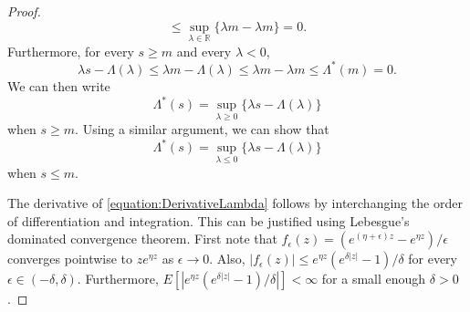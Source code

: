 \begin{proof}
\begin{equation*}
\leq \sup_{\lambda \in \mathbb{R}} \{ \lambda m - \lambda m \} = 0 .
\end{equation*}
Furthermore, for every $s \geq m$ and every $\lambda < 0$,
\begin{equation*}
\lambda s - \Lambda(\lambda)
\leq \lambda m - \Lambda(\lambda)
\leq \lambda m - \lambda m
\leq \Lambda^*(m) = 0 .
\end{equation*}
We can then write
\begin{equation*}
\Lambda^*(s) = \sup_{\lambda \geq 0} \{ \lambda s - \Lambda (\lambda) \}
\end{equation*}
when $s \geq m$.
Using a similar argument, we can show that
\begin{equation*}
\Lambda^*(s) = \sup_{\lambda \leq 0} \{ \lambda s - \Lambda (\lambda) \}
\end{equation*}
when $s \leq m$.

The derivative of \eqref{equation:DerivativeLambda} follows by interchanging the order of differentiation and integration.
This can be justified using Lebesgue's dominated convergence theorem.
First note that $f_{\epsilon}(z) = (e^{(\eta + \epsilon)z} - e^{\eta z})/\epsilon$ converges pointwise to $z e^{\eta z}$ as $\epsilon \rightarrow 0$.
Also, $|f_{\epsilon}(z)| \leq e^{\eta z} (e^{\delta |z|} - 1) / \delta$ for every $\epsilon \in (-\delta, \delta)$.
Furthermore, $E \left[ | e^{\eta z} (e^{\delta |z|} - 1) / \delta | \right] < \infty$ for a small enough $\delta > 0$.
\end{proof}

